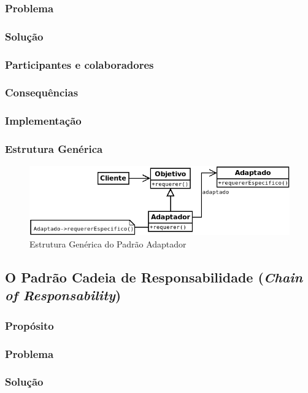 \subsubsection{Problema}
\subsubsection{Solução}
\subsubsection{Participantes e colaboradores}
\subsubsection{Consequências}
\subsubsection{Implementação}
\subsubsection{Estrutura Genérica}

\begin{figure}[h]
\begin{center}
\includegraphics[scale=0.6]{adaptador.png}
\caption{Estrutura Genérica do Padrão Adaptador}\label{fig:adaptador}
\end{center}
\end{figure}

\subsection{O Padrão Cadeia de Responsabilidade (\textit{Chain of Responsability})}
\subsubsection{Propósito}
\subsubsection{Problema}
\subsubsection{Solução}
